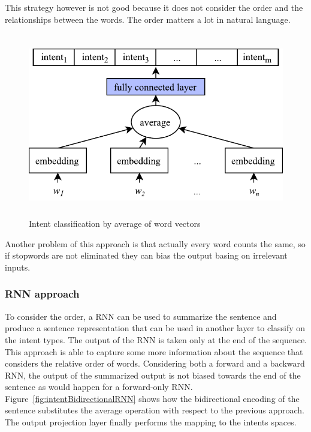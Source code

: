 This strategy however is not good because it does not consider the order and the relationships between the words. The order matters a lot in natural language.


\begin{figure}[!htbp]
    \centering
    \includegraphics[max width=\linewidth,max height=8cm,keepaspectratio]{figures/intentAverage}
    \caption{Intent classification by average of word vectors}\label{fig:intentAverage}
\end{figure}

Another problem of this approach is that actually every word counts the same, so if stopwords are not eliminated they can bias the output basing on irrelevant inputs.

\subsubsection{RNN approach}
To consider the order, a RNN can be used to summarize the sentence and produce a sentence representation that can be used in another layer to classify on the intent types. The output of the RNN is taken only at the end of the sequence. This approach is able to capture some more information about the sequence that considers the relative order of words. Considering both a forward and a backward RNN, the output of the summarized output is not biased towards the end of the sentence as would happen for a forward-only RNN. Figure~\ref{fig:intentBidirectionalRNN} shows how the bidirectional encoding of the sentence substitutes the average operation with respect to the previous approach. The output projection layer finally performs the mapping to the intents spaces.

